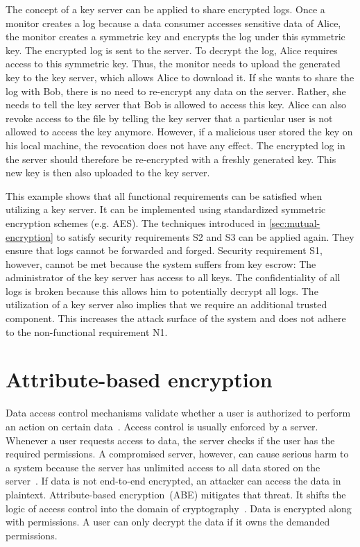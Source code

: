 \documentclass[../main.tex]{subfiles}
\begin{document}
The concept of a key server can be applied to share encrypted logs.
Once a monitor creates a log because a data consumer accesses sensitive data of Alice, the monitor creates a symmetric key and encrypts the log under this symmetric key.
The encrypted log is sent to the server.
To decrypt the log, Alice requires access to this symmetric key.
Thus, the monitor needs to upload the generated key to the key server, which allows Alice to download it.
If she wants to share the log with Bob, there is no need to re-encrypt any data on the server.
Rather, she needs to tell the key server that Bob is allowed to access this key.
Alice can also revoke access to the file by telling the key server that a particular user is not allowed to access the key anymore.
However, if a malicious user stored the key on his local machine, the revocation does not have any effect.
The encrypted log in the server should therefore be re-encrypted with a freshly generated key.
This new key is then also uploaded to the key server.

This example shows that all functional requirements can be satisfied when utilizing a key server.
It can be implemented using standardized symmetric encryption schemes (e.g. AES).
The techniques introduced in \cref{sec:mutual-encryption} to satisfy security requirements S2 and S3 can be applied again.
They ensure that logs cannot be forwarded and forged.
Security requirement S1, however, cannot be met because the system suffers from key escrow: 
The administrator of the key server has access to all keys.
The confidentiality of all logs is broken because this allows him to potentially decrypt all logs.
The utilization of a key server also implies that we require an additional trusted component.
This increases the attack surface of the system and does not adhere to the non-functional requirement N1.

\section{Attribute-based encryption}
\label{sec:attribute-encryption}
Data access control mechanisms validate whether a user is authorized to perform an action on certain data~\cite[242]{Eckert2018}.
Access control is usually enforced by a server.
Whenever a user requests access to data, the server checks if the user has the required permissions.
A compromised server, however, can cause serious harm to a system because the server has unlimited access to all data stored on the server~\cite{Hagg2022}.
If data is not end-to-end encrypted, an attacker can access the data in plaintext.
Attribute-based encryption~(ABE) mitigates that threat.
It shifts the logic of access control into the domain of cryptography~\cite{Bethencourt2007}.
Data is encrypted along with permissions.
A user can only decrypt the data if it owns the demanded permissions.
\end{document}
